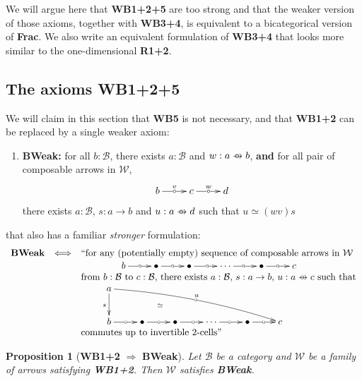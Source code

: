 \documentclass{article}
\numberwithin{equation}{section}
\theoremstyle{definition}
\theoremstyle{plain}
\newtheorem{proposition}[equation]{Proposition}
\newcommand{\wto}{\to \hspace{-1.1em} \circ \hspace{0.6em}}
\begin{document}
We will argue here that \textbf{WB1+2+5} are too strong and that the weaker version of those axioms, together with \textbf{WB3+4}, is equivalent to a bicategorical version of \textbf{Frac}. We also write an equivalent formulation of \textbf{WB3+4} that looks more similar to the one-dimensional \textbf{R1+2}.

\subsection{The axioms \textbf{WB1+2+5}}

We will claim in this section that \textbf{WB5} is not necessary, and that \textbf{WB1+2} can be replaced by a single weaker axiom:

\begin{enumerate}[label = $\bullet$]
	\item \textbf{BWeak:} for all $b:\mathcal{B}$, there exists $a:\mathcal{B}$ and $w: a \wto b$, \textbf{and} for all pair of composable arrows in $\mathcal{W}$, 
	\[\xymatrix{b \ar[r]^v|{\circ} & c \ar[r]^w|{\circ} & d}\] there exists $a:\mathcal{B}$, $s:a \to b$ and $u:a \wto d$ such that $u \simeq (wv)s$
\end{enumerate}
that also has a familiar \textit{stronger} formulation:
\[\begin{array}{rcl}
	\textnormal{\textbf{BWeak}} & \Longleftrightarrow & \text{``for any (potentially empty) sequence of composable arrows in $\mathcal{W}$}\\
	&& \qquad  \qquad \xymatrix{b \ar[r]|{\circ} & \bullet \ar[r]|{\circ} & \bullet \ar[r]|{\circ} & \cdots \ar[r]|{\circ} & \bullet \ar[r]|{\circ} & c}\\
	&& \text{from $b:\mathcal{B}$ to $c:\mathcal{B}$, there exists $a:\mathcal{B}$, $s: a \to b$, $u:a \wto c$ such that}\\
	&& \qquad \xymatrix{a \ar@/^/[drrrrr]^{u}|{\circ} \ar[d]_{s} \ar@{}[drrr]|{\simeq}\\ b \ar[r]|{\circ} & \bullet \ar[r]|{\circ} & \bullet \ar[r]|{\circ} & \cdots \ar[r]|{\circ} & \bullet \ar[r]|{\circ} & c}\\
	&& \text{commutes up to invertible 2-cells''}
\end{array}\]

\begin{proposition}[\textbf{WB1+2} $\Longrightarrow$ \textbf{BWeak}]
	Let $\mathcal{B}$ be a category and $\mathcal{W}$ be a family of arrows satisfying \textbf{WB1+2}. Then $\mathcal{W}$ satisfies \textbf{BWeak}.
\end{proposition}
\end{document}
